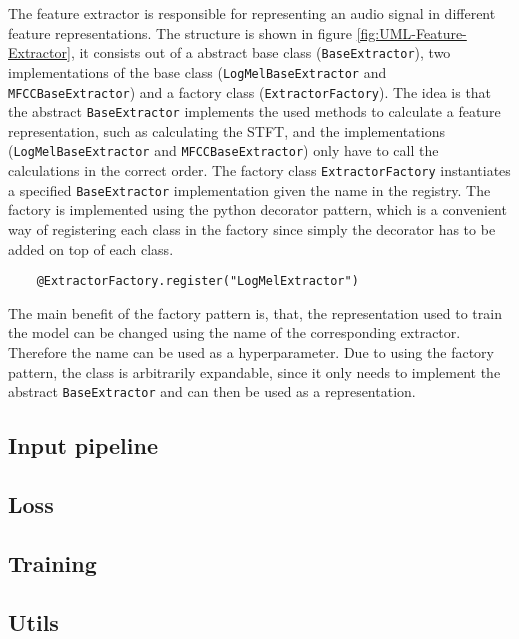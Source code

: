 \noindent
The feature extractor is responsible for representing an audio signal in different feature representations. The structure is shown in figure \ref{fig:UML-Feature-Extractor}, it consists out of a abstract base class (\texttt{BaseExtractor}), two implementations of the base class (\texttt{LogMelBaseExtractor} and \texttt{MFCCBaseExtractor}) and a factory class (\texttt{ExtractorFactory}). The idea is that the abstract \texttt{BaseExtractor} implements the used methods to calculate a feature representation, such as calculating the \gls{STFT}, and the implementations (\texttt{LogMelBaseExtractor} and \texttt{MFCCBaseExtractor}) only have to call the calculations in the correct order. The factory class \texttt{ExtractorFactory} instantiates a specified \texttt{BaseExtractor} implementation given the name in the registry. The factory is implemented using the python decorator pattern, which is a convenient way of registering each class in the factory since simply the decorator has to be added on top of each class.
\begin{verbatim}
    @ExtractorFactory.register("LogMelExtractor")
\end{verbatim}
The main benefit of the factory pattern is, that, the representation used to train the model can be changed using the name of the corresponding extractor. Therefore the name can be used as a hyperparameter. Due to using the factory pattern, the class is arbitrarily expandable, since it only needs to implement the abstract \texttt{BaseExtractor} and can then be used as a representation.

\subsection{Input pipeline}
\label{sub:Component-Input-pipeline}

\subsection{Loss}
\label{sub:Component-Loss}

\subsection{Training}
\label{sub:Component-Training}

\subsection{Utils}
\label{sub:Component-Utils}

